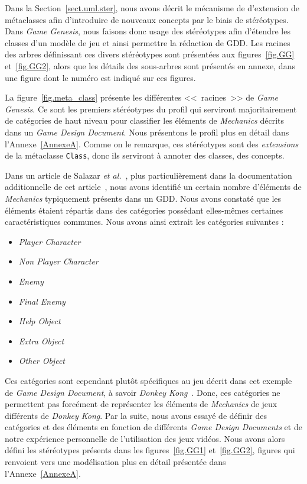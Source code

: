 Dans la Section~\ref{sect.uml.ster}, nous avons décrit le mécanisme de d'extension de m\'etaclasses afin d'introduire de nouveaux concepts par le biais de stéréotypes. 
Dans \emph{Game Genesis}, nous faisons donc usage des stéréotypes afin d'étendre les classes d'un modèle de jeu et ainsi permettre la rédaction de GDD.
%
Les racines des arbres définissant ces divers stéréotypes sont
présentées aux figures~\ref{fig.GG} et~\ref{fig.GG2}, alors que les
détails des sous-arbres sont présentés en annexe, dans une figure
dont le numéro est indiqué sur ces figures.

La figure~\ref{fig.meta_class} présente les différentes <<~racines~>> de \emph{Game Genesis}. 
Ce sont les premiers stéréotypes du profil qui serviront majoritairement de catégories de haut niveau pour classifier les éléments de \emph{Mechanics} décrits dans un \emph{Game Design Document}.
Nous présentons le profil plus en détail dans l'Annexe~\ref{AnnexeA}.
%
Comme on le remarque, ces stéréotypes sont des \emph{extensions} de la
métaclasse \texttt{Class}, donc ils serviront à annoter des classes, des concepts.


Dans un article de Salazar \emph{et al.}~\cite{GDD_software}, plus particulièrement dans la documentation additionnelle de cet article~\cite{salazar_gdd}, nous avons identifié un certain nombre d'\'el\'ements de \emph{Mechanics} typiquement présents dans un GDD.
Nous avons constaté que les éléments étaient répartis dans des catégories possédant elles-mêmes certaines caractéristiques communes. 
Nous avons ainsi extrait les catégories suivantes :

\begin{itemize}
    \item \emph{Player Character}
    \item \emph{Non Player Character}
    \item \emph{Enemy}
    \item \emph{Final Enemy}
    \item \emph{Help Object}
    \item \emph{Extra Object}
    \item \emph{Other Object}
\end{itemize}



Ces catégories sont cependant plutôt spécifiques au jeu décrit dans cet exemple de \emph{Game Design Document}, à savoir \emph{Donkey Kong}~\cite{salazar_gdd}.
Donc, ces catégories ne permettent pas forcément de représenter les éléments de \emph{Mechanics} de jeux différents de \emph{Donkey Kong}.
Par la suite, nous avons essayé de définir des catégories et des éléments en fonction de différents \emph{Game Design Documents} et de notre expérience personnelle de l'utilisation des jeux vidéos.
Nous avons alors défini les stéréotypes présents dans les figures~\ref{fig.GG1} et~\ref{fig.GG2},
figures qui renvoient vers une modélisation plus en détail présentée dans l'Annexe~\ref{AnnexeA}.

